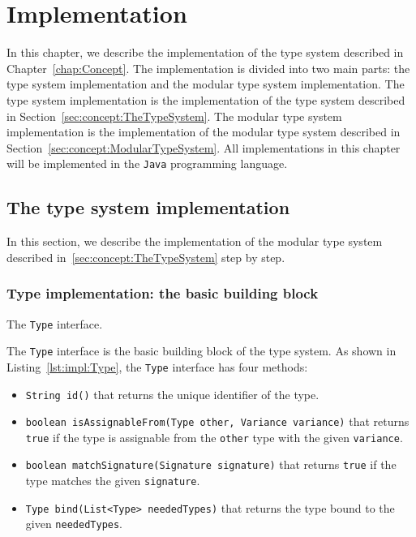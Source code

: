 \chapter{Implementation}\label{chap:Implementation}

In this chapter, we describe the implementation of the type system described in Chapter~\ref{chap:Concept}. The implementation is divided into two main parts: the type system implementation and the modular type system implementation. The type system implementation is the implementation of the type system described in Section~\ref{sec:concept:TheTypeSystem}. The modular type system implementation is the implementation of the modular type system described in Section~\ref{sec:concept:ModularTypeSystem}.
All implementations in this chapter will be implemented in the \texttt{Java} programming language.

\section{The type system implementation}\label{sec:impl:TypeSystem}

In this section, we describe the implementation of the modular type system described in~\ref{sec:concept:TheTypeSystem} step by step.

\subsection{Type implementation: the basic building block}\label{sec:impl:Type}

\begin{Listing}[tbh]
    \centering
    \caption{The \texttt{Type} interface.}
    \label{lst:impl:Type}
\end{Listing}

The \texttt{Type} interface is the basic building block of the type system. As shown in Listing~\ref{lst:impl:Type}, the \texttt{Type} interface has four methods:
\begin{itemize}
    \item \texttt{String id()} that returns the unique identifier of the type.
    \item \texttt{boolean isAssignableFrom(Type other, Variance variance)} that returns \texttt{true} if the type is assignable from the \texttt{other} type with the given \texttt{variance}.
    \item \texttt{boolean matchSignature(Signature signature)} that returns \texttt{true} if the type matches the given \texttt{signature}.
    \item \texttt{Type bind(List<Type> neededTypes)} that returns the type bound to the given \texttt{neededTypes}.
\end{itemize}

